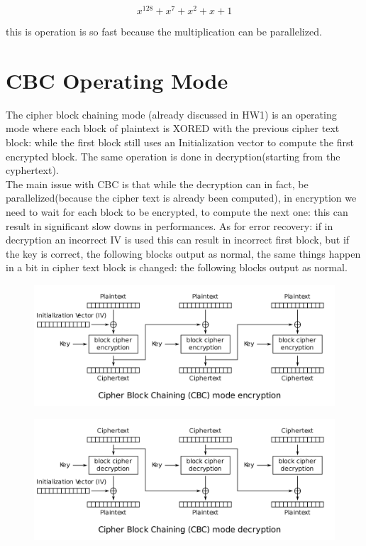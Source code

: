 \documentclass{article}
\begin{document}
 \[{x^{128}+x^{7}+x^{2}+x+1 }\] 
 
 this is operation is so fast because the multiplication can be parallelized.
 
\section{CBC Operating Mode}\label{sec:cbcop}
The cipher block chaining mode (already discussed in HW1) is an operating mode where each block of plaintext is XORED with the previous cipher text block: while the first block still uses an Initialization vector to compute the first encrypted block. The same operation is done in decryption(starting from the cyphertext).\\
The main issue with CBC is that while the decryption can in fact, be parallelized(because the cipher text is already been computed), in encryption we need to wait for each block to be encrypted, to compute the next one: this can result in significant slow downs in performances.
As for error recovery:  if in decryption an incorrect IV is used this can result in incorrect first block, but if the key is correct, the following blocks output as normal, the same things happen in a bit in cipher text block is changed: the following blocks output as normal.


	\begin{figure}[h]
		\includegraphics[width=1\textwidth ]{images/CBC_enc.png}
		\centering
	\end{figure}
	
	
	\begin{figure}[h]
		\includegraphics[width=1\textwidth ]{images/CBC_dec.png}
		\centering
	\end{figure}
\end{document}
